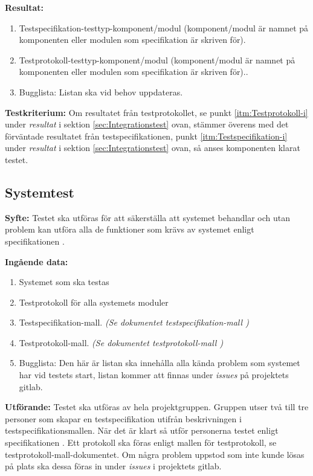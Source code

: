 \documentclass[a4paper,10pt, twoside]{article}
\begin{document}
\textbf{Resultat:}
    \begin{enumerate}
        \item \label{itm:Testspecifikation-i}
        Testspecifikation-testtyp-komponent/modul (komponent/modul är namnet på
        komponenten eller modulen som specifikation är skriven för).
        \item \label{itm:Testprotokoll-i} Testprotokoll-testtyp-komponent/modul
        (komponent/modul är namnet på komponenten eller modulen som
        specifikation är skriven för)..
        \item Bugglista: Listan ska vid behov uppdateras.
    \end{enumerate}

\textbf{Testkriterium:} Om resultatet från testprotokollet, se punkt \ref{itm:Testprotokoll-i} under \emph{resultat} i sektion
\ref{sec:Integrationstest} ovan, stämmer överens med det förväntade resultatet
från testspecifikationen, punkt \ref{itm:Testspecifikation-i} under
\emph{resultat} i sektion \ref{sec:Integrationstest} ovan, så anses komponenten
klarat testet.

\subsection{Systemtest}
\label{sec:Systemtest}
\textbf{Syfte:}
Testet ska utföras för att säkerställa att systemet behandlar och utan problem
kan utföra alla de funktioner som krävs av systemet enligt specifikationen
\cite{kravspec}.

\textbf{Ingående data:}
   \begin{enumerate}
       \item Systemet som ska testas
       \item Testprotokoll för alla systemets moduler
       \item Testspecifikation-mall.
       \emph{(Se dokumentet testspecifikation-mall \cite{testspec-mall})}
       \item Testprotokoll-mall.
       \emph{(Se dokumentet testprotokoll-mall \cite{testprot-mall})}
       \item Bugglista: Den här är listan ska innehålla alla kända problem som
       systemet har vid testets start, listan kommer att finnas under
       \emph{issues} på projektets gitlab.
   \end{enumerate}

\textbf{Utförande:} Testet ska utföras av hela projektgruppen. Gruppen utser två
till tre personer som skapar en testspecifikation utifrån beskrivningen i
testspecifikationsmallen. När det är klart så utför personerna testet enligt
specifikationen \cite{kravspec}. Ett protokoll ska föras enligt mallen för
testprotokoll, se testprotokoll-mall-dokumentet. Om några problem uppstod som
inte kunde lösas på plats ska dessa föras in under \emph{issues} i projektets
gitlab.
\end{document}

